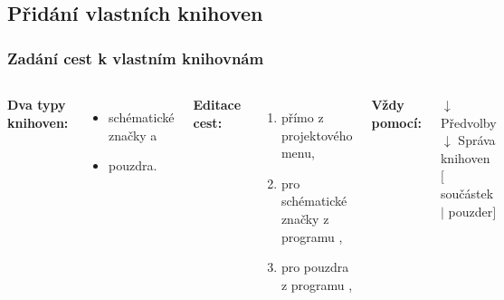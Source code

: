 \documentclass{beamer}
\begin{document}
\subsection{\texorpdfstring{Přidání vlastních knihoven}{Pridani vlastnich knihoven}}
\begin{frame}
	\frametitle{Zadání cest k vlastním knihovnám}
	\begin{columns}
	
		\small
		\textbf{Dva typy knihoven:}
		\begin{itemize}
			\item schématické značky a
			\item pouzdra.
		\end{itemize}
		
		\textbf{Editace cest:}
		\begin{enumerate}
			\item přímo z projektového menu,
			\item pro schématické značky z programu ,
			\item pro pouzdra z programu ,
		\end{enumerate}
		
		\textbf{Vždy pomocí:}
		
		$\downarrow$ Předvolby $\downarrow$ Správa knihoven $[$součástek $|$ pouzder$]$
	
		\begin{center}
			\includegraphics[width=\textwidth]{obr/knihovny01.png}
		\end{center}
	
	\end{columns}
\end{frame}
\end{document}
